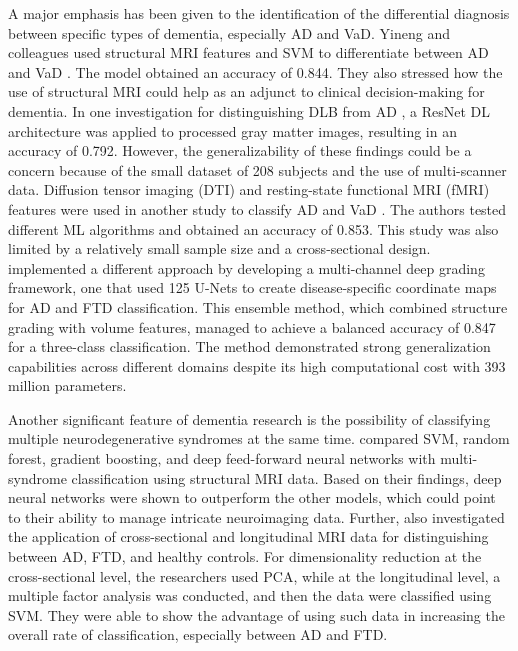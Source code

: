 A major emphasis has been given to the identification of the differential diagnosis between specific types of dementia, especially AD and VaD. Yineng and colleagues used structural MRI features and SVM to differentiate between AD and VaD \cite{Yineng2019Machine}. The model obtained an accuracy of 0.844. They also stressed how the use of structural MRI could help as an adjunct to clinical decision-making for dementia. In one investigation for distinguishing DLB from AD \cite{Nemoto2021Differentiating}, a ResNet DL architecture was applied to processed gray matter images, resulting in an accuracy of 0.792. However, the generalizability of these findings could be a concern because of the small dataset of 208 subjects and the use of multi-scanner data. Diffusion tensor imaging (DTI) and resting-state functional MRI (fMRI) features were used in another study to classify AD and VaD \cite{Castellazzi2020Machine}. The authors tested different ML algorithms and obtained an accuracy of 0.853. This study was also limited by a relatively small sample size and a cross-sectional design.  implemented a different approach by developing a multi-channel deep grading framework, one that used 125 U-Nets to create disease-specific coordinate maps for AD and FTD classification. This ensemble method, which combined structure grading with volume features, managed to achieve a balanced accuracy of 0.847 for a three-class classification. The method demonstrated strong generalization capabilities across different domains despite its high computational cost with 393 million parameters.

Another significant feature of dementia research is the possibility of classifying multiple neurodegenerative syndromes at the same time.  compared SVM, random forest, gradient boosting, and deep feed-forward neural networks with multi-syndrome classification using structural MRI data. Based on their findings, deep neural networks were shown to outperform the other models, which could point to their ability to manage intricate neuroimaging data. Further,  also investigated the application of cross-sectional and longitudinal MRI data for distinguishing between AD, FTD, and healthy controls. For dimensionality reduction at the cross-sectional level, the researchers used PCA, while at the longitudinal level, a multiple factor analysis was conducted, and then the data were classified using SVM. They were able to show the advantage of using such data in increasing the overall rate of classification, especially between AD and FTD. 

